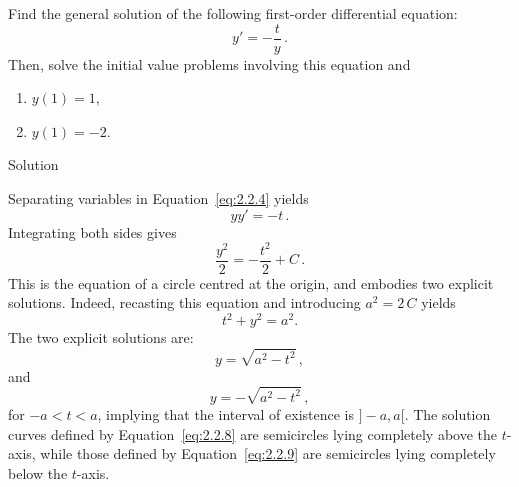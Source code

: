 \begin{example}\label{example:2.2.2} 
Find the general solution of the following first-order differential equation:
\begin{equation} \label{eq:2.2.4}
y'=-\dfrac{t}{y}\,.
\end{equation}
Then, solve the initial value problems involving this equation and
\begin{enumerate}
    \item $y(1)=1$,
    \item $y(1)=-2$.
\end{enumerate}

Solution 

Separating variables in Equation~\eqref{eq:2.2.4}  yields
$$
yy'=-t\,.
$$
Integrating both sides gives
$$
\dfrac{y^2}{2}=-\dfrac{t^2}{2}+C\,.
$$
This is the equation of a circle centred at the origin, and embodies two explicit solutions. Indeed, recasting this equation and introducing $a^2=2\,C$ yields
\begin{equation} \label{eq:2.2.7}
t^2+y^2=a^2.
\end{equation}
The two explicit solutions are:
\begin{equation} \label{eq:2.2.8}
y=\sqrt{a^2-t^2}\,,
\end{equation}
 and
\begin{equation} \label{eq:2.2.9}
y= - \sqrt{a^2-t^2}\,,
\end{equation}
for $-a < t < a$, implying that the interval of existence is $]-a , a[$.
The solution curves defined by Equation~\eqref{eq:2.2.8} are semicircles lying completely above the
$t$-axis, while those defined by Equation~\eqref{eq:2.2.9}  are semicircles lying completely below the $t$-axis.


\end{example}
